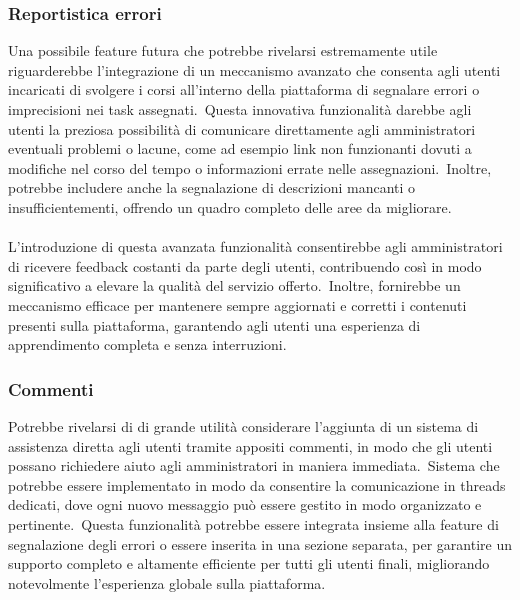 \subsubsection{Reportistica errori}
Una possibile feature futura che potrebbe rivelarsi estremamente utile riguarderebbe 
l'integrazione di un meccanismo avanzato che consenta agli utenti incaricati di svolgere 
i corsi all'interno della piattaforma di segnalare errori o imprecisioni nei task assegnati.\ 
Questa innovativa funzionalità darebbe agli utenti la preziosa possibilità di comunicare direttamente 
agli amministratori eventuali problemi o lacune, come ad esempio link non funzionanti dovuti a modifiche 
nel corso del tempo o informazioni errate nelle assegnazioni.\ Inoltre, potrebbe includere anche la segnalazione 
di descrizioni mancanti o insufficientementi, offrendo un quadro completo delle aree da migliorare.
\\ \\
L'introduzione di questa avanzata funzionalità consentirebbe agli amministratori di ricevere feedback costanti 
da parte degli utenti, contribuendo così in modo significativo a elevare la qualità del servizio offerto.\ 
Inoltre, fornirebbe un meccanismo efficace per mantenere sempre aggiornati e corretti i contenuti presenti 
sulla piattaforma, garantendo agli utenti una esperienza di apprendimento completa e senza interruzioni.
\subsubsection{Commenti}
Potrebbe rivelarsi di di grande utilità considerare l'aggiunta di un sistema di assistenza diretta agli utenti 
tramite appositi commenti, in modo che gli utenti possano richiedere aiuto agli amministratori in maniera immediata.\ 
Sistema che potrebbe essere implementato in modo da consentire la comunicazione in threads dedicati, dove 
ogni nuovo messaggio può essere gestito in modo organizzato e pertinente.\ 
Questa funzionalità potrebbe essere integrata insieme alla feature di segnalazione degli errori o essere 
inserita in una sezione separata, per garantire un supporto completo e altamente efficiente per tutti gli utenti finali, 
migliorando notevolmente l'esperienza globale sulla piattaforma.
%
